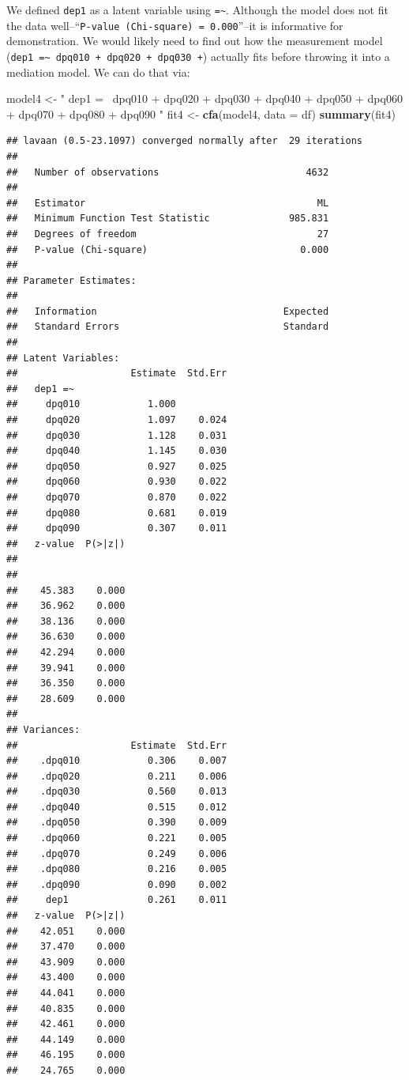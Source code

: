 \documentclass[]{tufte-book}
\newenvironment{Shaded}{}{}
\newcommand{\KeywordTok}[1]{\textcolor[rgb]{0.00,0.44,0.13}{\textbf{#1}}}
\newcommand{\DataTypeTok}[1]{\textcolor[rgb]{0.56,0.13,0.00}{#1}}
\newcommand{\StringTok}[1]{\textcolor[rgb]{0.25,0.44,0.63}{#1}}
\newcommand{\NormalTok}[1]{#1}
\theoremstyle{definition}
\theoremstyle{definition}
\theoremstyle{remark}
\begin{document}
We defined \texttt{dep1} as a latent variable using
\texttt{=\textasciitilde{}}. Although the model does not fit the data
well--``\texttt{P-value\ (Chi-square)\ =\ 0.000}''--it is informative
for demonstration. We would likely need to find out how the measurement
model
(\texttt{dep1\ =\textasciitilde{}\ dpq010\ +\ dpq020\ +\ dpq030\ +})
actually fits before throwing it into a mediation model. We can do that
via:

\begin{Shaded}
\begin{Highlighting}[]
\NormalTok{model4 <-}\StringTok{ "}
\StringTok{  dep1 =~ dpq010 + dpq020 + dpq030 + dpq040 + dpq050 + dpq060 + dpq070 + dpq080 + dpq090}
\StringTok{"}
\NormalTok{fit4 <-}\StringTok{ }\KeywordTok{cfa}\NormalTok{(model4, }\DataTypeTok{data =}\NormalTok{ df)}
\KeywordTok{summary}\NormalTok{(fit4)}
\end{Highlighting}
\end{Shaded}

\begin{verbatim}
## lavaan (0.5-23.1097) converged normally after  29 iterations
## 
##   Number of observations                          4632
## 
##   Estimator                                         ML
##   Minimum Function Test Statistic              985.831
##   Degrees of freedom                                27
##   P-value (Chi-square)                           0.000
## 
## Parameter Estimates:
## 
##   Information                                 Expected
##   Standard Errors                             Standard
## 
## Latent Variables:
##                    Estimate  Std.Err
##   dep1 =~                           
##     dpq010            1.000         
##     dpq020            1.097    0.024
##     dpq030            1.128    0.031
##     dpq040            1.145    0.030
##     dpq050            0.927    0.025
##     dpq060            0.930    0.022
##     dpq070            0.870    0.022
##     dpq080            0.681    0.019
##     dpq090            0.307    0.011
##   z-value  P(>|z|)
##                   
##                   
##    45.383    0.000
##    36.962    0.000
##    38.136    0.000
##    36.630    0.000
##    42.294    0.000
##    39.941    0.000
##    36.350    0.000
##    28.609    0.000
## 
## Variances:
##                    Estimate  Std.Err
##    .dpq010            0.306    0.007
##    .dpq020            0.211    0.006
##    .dpq030            0.560    0.013
##    .dpq040            0.515    0.012
##    .dpq050            0.390    0.009
##    .dpq060            0.221    0.005
##    .dpq070            0.249    0.006
##    .dpq080            0.216    0.005
##    .dpq090            0.090    0.002
##     dep1              0.261    0.011
##   z-value  P(>|z|)
##    42.051    0.000
##    37.470    0.000
##    43.909    0.000
##    43.400    0.000
##    44.041    0.000
##    40.835    0.000
##    42.461    0.000
##    44.149    0.000
##    46.195    0.000
##    24.765    0.000
\end{verbatim}
\end{document}
